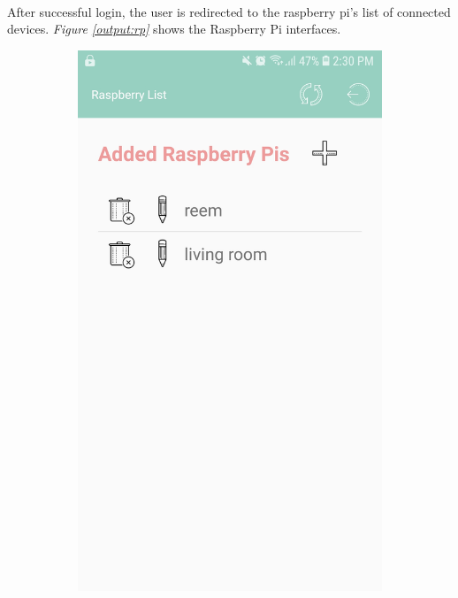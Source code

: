 \documentclass[12pt, oneside, a4paper]{book}
\begin{document}
		\paragraph{} After successful login, the user is redirected to the raspberry pi's list of connected devices. \textit{Figure \ref{output:rp}} shows the Raspberry Pi interfaces. 
		\begin{figure}[H]
			\centering
			\begin{subfigure}[b]{.4\linewidth}
				\includegraphics[width=\linewidth]{img/output_raspberry_list.jpg}

\end{subfigure}
\end{figure}
\end{document}
